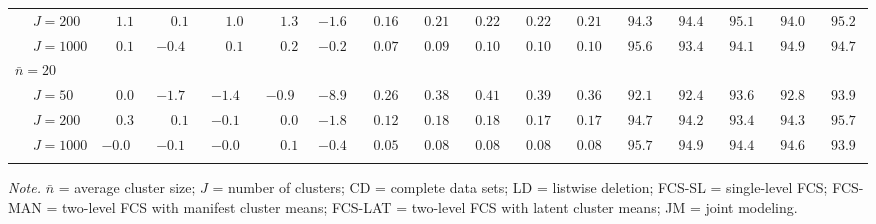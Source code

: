 \begin{sidewaystable}
\begin{threeparttable}
\begin{tabular}{llccccccccccccccc}
 & \nopagebreak $\;J=200$  & $\phantom{-}1.1\phantom{0}$ & $\phantom{-}0.1\phantom{0}$ & $\phantom{-}1.0\phantom{0}$ & $\phantom{-}1.3\phantom{0}$ & ${-}1.6\phantom{0}$ & $\phantom{0}0.16\phantom{0}$ & $\phantom{0}0.21\phantom{0}$ & $\phantom{0}0.22\phantom{0}$ & $\phantom{0}0.22\phantom{0}$ & $\phantom{0}0.21\phantom{0}$ & $\phantom{0}94.3\phantom{0}$ & $\phantom{0}94.4\phantom{0}$ & $\phantom{0}95.1\phantom{0}$ & $\phantom{0}94.0\phantom{0}$ & $\phantom{0}95.2\phantom{0}$ \\
 & \nopagebreak $\;J=1000$  & $\phantom{-}0.1\phantom{0}$ & ${-}0.4\phantom{0}$ & $\phantom{-}0.1\phantom{0}$ & $\phantom{-}0.2\phantom{0}$ & ${-}0.2\phantom{0}$ & $\phantom{0}0.07\phantom{0}$ & $\phantom{0}0.09\phantom{0}$ & $\phantom{0}0.10\phantom{0}$ & $\phantom{0}0.10\phantom{0}$ & $\phantom{0}0.10\phantom{0}$ & $\phantom{0}95.6\phantom{0}$ & $\phantom{0}93.4\phantom{0}$ & $\phantom{0}94.1\phantom{0}$ & $\phantom{0}94.9\phantom{0}$ & $\phantom{0}94.7\phantom{0}$ \\
\multicolumn{4}{l}{$\bar{n}=20$} \\  & \nopagebreak $\;J=50$  & $\phantom{-}0.0\phantom{0}$ & ${-}1.7\phantom{0}$ & ${-}1.4\phantom{0}$ & ${-}0.9\phantom{0}$ & ${-}8.9\phantom{0}$ & $\phantom{0}0.26\phantom{0}$ & $\phantom{0}0.38\phantom{0}$ & $\phantom{0}0.41\phantom{0}$ & $\phantom{0}0.39\phantom{0}$ & $\phantom{0}0.36\phantom{0}$ & $\phantom{0}92.1\phantom{0}$ & $\phantom{0}92.4\phantom{0}$ & $\phantom{0}93.6\phantom{0}$ & $\phantom{0}92.8\phantom{0}$ & $\phantom{0}93.9\phantom{0}$ \\
 & \nopagebreak $\;J=200$  & $\phantom{-}0.3\phantom{0}$ & $\phantom{-}0.1\phantom{0}$ & ${-}0.1\phantom{0}$ & $\phantom{-}0.0\phantom{0}$ & ${-}1.8\phantom{0}$ & $\phantom{0}0.12\phantom{0}$ & $\phantom{0}0.18\phantom{0}$ & $\phantom{0}0.18\phantom{0}$ & $\phantom{0}0.17\phantom{0}$ & $\phantom{0}0.17\phantom{0}$ & $\phantom{0}94.7\phantom{0}$ & $\phantom{0}94.2\phantom{0}$ & $\phantom{0}93.4\phantom{0}$ & $\phantom{0}94.3\phantom{0}$ & $\phantom{0}95.7\phantom{0}$ \\
 & \nopagebreak $\;J=1000$  & ${-}0.0\phantom{0}$ & ${-}0.1\phantom{0}$ & ${-}0.0\phantom{0}$ & $\phantom{-}0.1\phantom{0}$ & ${-}0.4\phantom{0}$ & $\phantom{0}0.05\phantom{0}$ & $\phantom{0}0.08\phantom{0}$ & $\phantom{0}0.08\phantom{0}$ & $\phantom{0}0.08\phantom{0}$ & $\phantom{0}0.08\phantom{0}$ & $\phantom{0}95.7\phantom{0}$ & $\phantom{0}94.9\phantom{0}$ & $\phantom{0}94.4\phantom{0}$ & $\phantom{0}94.6\phantom{0}$ & $\phantom{0}93.9\phantom{0}$ \\
[0.5ex]\hline\\[-1.6ex] 
\end{tabular}
\begin{tablenotes}{\footnotesize \textit{Note.} $\bar{n}$ = average cluster size; $J$ = number of clusters; CD = complete data sets; LD = listwise deletion; FCS-SL = single-level FCS; FCS-MAN = two-level FCS with manifest cluster means; FCS-LAT = two-level FCS with latent cluster means; JM = joint modeling.}\end{tablenotes}
\end{threeparttable}
\end{sidewaystable}
